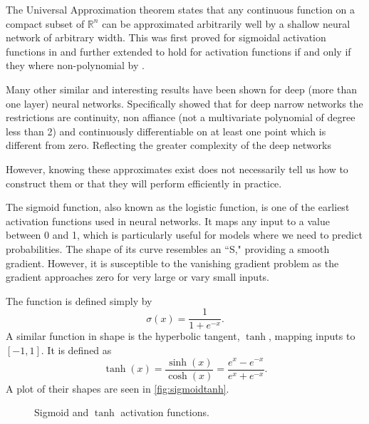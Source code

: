 \documentclass{article}
\theoremstyle{definition}
\begin{document}
The Universal Approximation theorem states that any continuous function on a compact subset of $\mathbb{R}^{n}$ can be approximated arbitrarily well by a shallow neural network of arbitrary width. This was first proved for sigmoidal activation functions in  \textcite{universalapprox} and further extended to hold for activation functions if and only if they where non-polynomial by \textcite{pinkus_1999}. 

Many other similar and interesting results have been shown for deep (more than one layer) neural networks. Specifically \textcite{kidger2020universal} showed that for  deep narrow networks the restrictions are continuity, non affiance (not a multivariate polynomial of degree less than 2) and continuously differentiable on at least one point which is different from zero. Reflecting the greater complexity of the deep networks

However, knowing these approximates exist does not necessarily tell us how to construct them or that they will perform efficiently in practice.

The sigmoid function, also known as the logistic function, is one of the earliest activation functions used in neural networks. It maps any input to a value between 0 and 1, which is particularly useful for models where we need to predict probabilities. The shape of its curve resembles an ``S," providing a smooth gradient. However, it is susceptible to the vanishing gradient problem as the gradient approaches zero for very large or vary small inputs.

The function is defined simply by
\begin{equation*}
    \sigma(x) = \frac{1}{1 + e^{-x}}.
\end{equation*}
A similar function in shape is the hyperbolic tangent, $\tanh$, mapping inputs to $[-1, 1]$. It is defined as
\begin{equation*}
    \tanh(x) = \frac{\sinh(x)}{\cosh(x)} = \frac{e^x - e^{-x}}{e^x + e^{-x}}.
\end{equation*}
A plot of their shapes are seen in \autoref{fig:sigmoidtanh}.

\begin{figure}[H]%
    \centering
    \qquad
    \caption{Sigmoid and $\tanh$ activation functions.}%
    \label{fig:sigmoidtanh}%
\end{figure}
\end{document}
